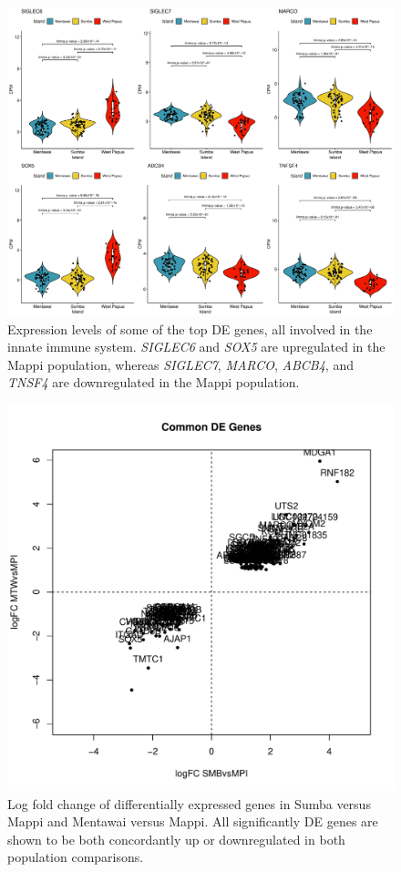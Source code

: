 \documentclass[12pt,a4paper,titlepage,twoside,openright]{book}
\begin{document}
\begin{mainmatter}
{\begin{figure}[htb!]
\centering
\includegraphics[width=\textwidth,height=\textheight,keepaspectratio]{Figures/favouriteTopGenes_distribution_Island.pdf}
\caption{Expression levels of some of the top DE genes, all involved in the innate immune system. \textit{SIGLEC6} and \textit{SOX5} are upregulated in the Mappi population, whereas \textit{SIGLEC7}, \textit{MARCO}, \textit{ABCB4}, and \textit{TNSF4} are downregulated in the Mappi population.}
\label{fig:top gene distributions}
\end{figure}

\begin{figure}[htb!]
\centering
\includegraphics[width=\textwidth,height=\textheight,keepaspectratio]{Figures/logFC_commonMPIgenes_dupCor.pdf}
\caption{Log fold change of differentially expressed genes in Sumba versus Mappi and Mentawai versus Mappi. All significantly DE genes are shown to be both concordantly up or downregulated in both population comparisons.}
\label{fig:LogFC: Mappi vs Others}
\end{figure}

}
\end{mainmatter}
\end{document}
